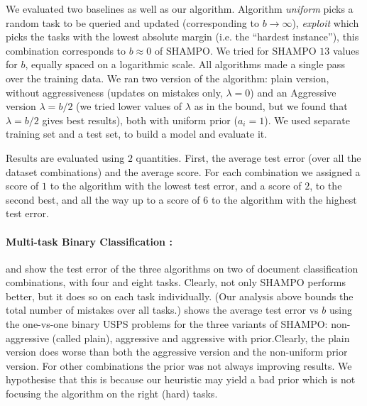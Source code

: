 We evaluated two baselines as well as our algorithm. Algorithm {\em uniform} picks a random task to be 
queried and updated (corresponding to $b\rightarrow\infty$), {\em exploit} which picks the tasks with the 
lowest absolute margin (i.e. the ``hardest instance''), this combination corresponds to $b \approx 0$ of 
SHAMPO. We tried for SHAMPO $13$ values for $b$, equally spaced on a logarithmic scale. 
All algorithms made a single pass over the training data.  We ran two version of the algorithm: 
plain version, without aggressiveness (updates on mistakes only, $\lambda=0$) and an 
Aggressive version $\lambda=b/2$ (we tried lower values of $\lambda$ as in the bound, 
but we found that $\lambda=b/2$ gives best results), both with uniform prior ($a_i=1$). 
We used separate training set and a test set, to build a model and evaluate it.

Results are evaluated using $2$ quantities. First, the average test error (over all the dataset combinations) 
and the average score. For each combination we assigned a score of $1$ to the algorithm with the lowest 
test error, and a score of $2$, to the second best, and all the way up to a score of $6$ to the algorithm with 
the highest test error.
%
\vspace{-0.1cm}
\paragraph{Multi-task Binary Classification :}
 and  show the test error of the three algorithms on two of document 
classification combinations, with four and eight tasks. Clearly, not only SHAMPO performs better, 
but it does so on each task individually. (Our analysis above bounds the total number of mistakes over all 
tasks.)  shows the average test error vs $b$ using the one-vs-one binary USPS 
problems for the three variants of SHAMPO: non-aggressive (called plain), aggressive and aggressive with 
prior.Clearly, the plain version does worse than both the aggressive version and the non-uniform prior version. 
For other combinations %
the prior was not always improving results. We hypothesise that this is because our heuristic may 
yield a bad prior which is not focusing the algorithm on the right (hard) tasks. 


